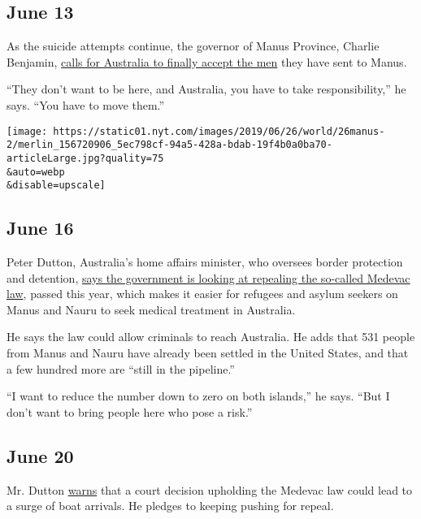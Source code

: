 \hypertarget{june-13}{%
\subsection{June 13}\label{june-13}}

As the suicide attempts continue, the governor of Manus Province,
Charlie Benjamin,
\href{https://www.abc.net.au/news/2019-06-13/manus--self-harm-crisis-escalates-as-governor-calls-for-help/11199258}{calls
for Australia to finally accept the men} they have sent to Manus.

``They don't want to be here, and Australia, you have to take
responsibility,'' he says. ``You have to move them.''

\texttt{[image: https://static01.nyt.com/images/2019/06/26/world/26manus-2/merlin\_156720906\_5ec798cf-94a5-428a-bdab-19f4b0a0ba70-articleLarge.jpg?quality=75\\\&auto=webp\\\&disable=upscale]}

\hypertarget{june-16}{%
\subsection{June 16}\label{june-16}}

Peter Dutton, Australia's home affairs minister, who oversees border
protection and detention,
\href{https://www.abc.net.au/news/2019-06-16/peter-dutton-unsure-medevac-arrivals-refugees-serious-offences/11214584}{says
the government is looking at repealing the so-called Medevac law},
passed this year, which makes it easier for refugees and asylum seekers
on Manus and Nauru to seek medical treatment in Australia.

He says the law could allow criminals to reach Australia. He adds that
531 people from Manus and Nauru have already been settled in the United
States, and that a few hundred more are ``still in the pipeline.''

``I want to reduce the number down to zero on both islands,'' he says.
``But I don't want to bring people here who pose a risk.''

\hypertarget{june-20}{%
\subsection{June 20}\label{june-20}}

Mr. Dutton
\href{https://www.abc.net.au/news/2019-06-20/warnings-of-boat-arrivals/11226254}{warns}
that a court decision upholding the Medevac law could lead to a surge of
boat arrivals. He pledges to keeping pushing for repeal.

